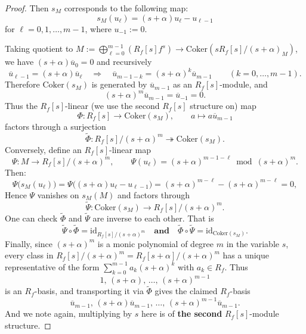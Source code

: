 \begin{proof}
    Then $s_M$ corresponds to the following map:
    \[
        s_M(u_\ell) = (s+\alpha)u_\ell - u_{\ell-1}
    \]
    for $\ell = 0, 1, \dots, m-1$, where $u_{-1} := 0$.

    Taking quotient to $M:=\bigoplus_{\ell=0}^{m-1} \left(R_{f}[s]f^{s}\right) \to \mathrm{Coker}(sR_f[s]\big/(s+\alpha)_M)$, we have $(s+\alpha)\overline u_0=0$ and recursively
    \[
        \overline u_{\ell-1}=(s+\alpha)\overline u_\ell\quad\Rightarrow\quad
        \overline u_{m-1-k}=(s+\alpha)^k\overline u_{m-1}\qquad (k=0,\dots,m-1).
    \]
    Therefore $\mathrm{Coker}(s_M)$ is generated by $\overline u_{m-1}$ as an $R_f[s]$-module, and
    \[
        (s+\alpha)^m\overline u_{m-1}=\overline u_{-1}=0.
    \]
    Thus the $R_f[s]$-linear (we use the second $R_f[s]$ structure on) map
    \[
        \Phi:R_f[s]\longrightarrow \mathrm{Coker}(s_M),\qquad a\longmapsto a\overline u_{m-1}
    \]
    factors through a surjection
    \[
        \widetilde\Phi:R_f[s]\big/(s+\alpha)^m \twoheadrightarrow \mathrm{Coker}(s_M).
    \]
    Conversely, define an $R_f[s]$-linear map
    \[
        \Psi:M\longrightarrow R_f[s]\big/(s+\alpha)^m,\qquad
        \Psi(u_\ell)=(s+\alpha)^{m-1-\ell}\bmod (s+\alpha)^m.
    \]
    Then:
    \[
        \Psi\bigl(s_M(u_\ell)\bigr)
        =\Psi\bigl((s+\alpha)u_\ell-u_{\ell-1}\bigr)
        =(s+\alpha)^{m-\ell}-(s+\alpha)^{m-\ell}=0,
    \]
    Hence $\Psi$ vanishes on $s_M(M)$ and factors through
    \[
        \widetilde\Psi:\mathrm{Coker}(s_M)\longrightarrow R_f[s]\big/(s+\alpha)^m.
    \]
    One can check $\widetilde\Phi$ and $\widetilde\Psi$ are inverse to each other. That is
    \[
        \widetilde\Psi\circ \widetilde\Phi=\mathrm{id}_{R_f[s]\big/(s+\alpha)^m} \quad \mathrm{\textbf{and}} \quad \widetilde\Phi\circ \widetilde\Psi=\mathrm{id}_{\mathrm{Coker}(s_M)}.
    \]
    Finally, since $(s+\alpha)^m$ is a monic polynomial of degree $m$ in the variable $s$,
    every class in $R_f[s]\big/(s+\alpha)^m = R_f[s+\alpha]\big/(s+\alpha)^m$ has a unique representative of the form
    $\sum_{k=0}^{m-1} a_k (s+\alpha)^k$ with $a_k\in R_f$.
    Thus
    \[
        1,\, (s+\alpha),\, \dots,\, (s+\alpha)^{m-1}
    \]
    is an $R_f$-basis,
    and transporting it via $\widetilde\Phi$ gives the claimed $R_f$-basis
    \[
        \overline u_{m-1},\, (s+\alpha)\overline u_{m-1},\, \dots,\, (s+\alpha)^{m-1}\overline u_{m-1}.
    \]
    And we note again, multiplying by $s$ here is of \textbf{the second} $R_f[s]$-module structure.


\end{proof}
